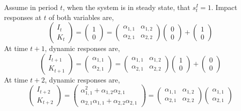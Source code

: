 \documentclass{article}
\begin{document}
Assume in period $t$, when the system is in steady state, that $s_t^I = 1$. Impact responses at $t$ of both variables are,
\begin{equation}\label{eq:I_responses_zero}
\begin{pmatrix}
I_t \\
K_t
\end{pmatrix} = \begin{pmatrix}
1 \\
0
\end{pmatrix} = \begin{pmatrix}
\alpha_{1,1} & \alpha_{1,2} \\
\alpha_{2,1} & \alpha_{2,2}
\end{pmatrix}\begin{pmatrix}
0 \\
0
\end{pmatrix} + \begin{pmatrix}
1 \\ 
0
\end{pmatrix}
\end{equation} 
At time $t + 1$, dynamic responses are,
\begin{equation}\label{eq:I_responses_one}
\begin{pmatrix}
I_{t+1} \\
K_{t+1}
\end{pmatrix} = \begin{pmatrix}
\alpha_{1,1} \\
\alpha_{2,1}
\end{pmatrix} = \begin{pmatrix}
\alpha_{1,1} & \alpha_{1,2} \\
\alpha_{2,1} & \alpha_{2,2}
\end{pmatrix}\begin{pmatrix}
1 \\
0
\end{pmatrix} + \begin{pmatrix}
0 \\ 
0
\end{pmatrix}
\end{equation} 
At time $t + 2$, dynamic responses are,
\begin{equation}\label{eq:I_responses_two}
\begin{pmatrix}
I_{t+2} \\
K_{t+2}
\end{pmatrix} = \begin{pmatrix}
\alpha_{1,1}^2 + \alpha_{1,2}\alpha_{2,1} \\
\alpha_{2,1}\alpha_{1,1} + \alpha_{2,2}\alpha_{2,1}
\end{pmatrix} = \begin{pmatrix}
\alpha_{1,1} & \alpha_{1,2} \\
\alpha_{2,1} & \alpha_{2,2}
\end{pmatrix}\begin{pmatrix}
\alpha_{1,1} \\
\alpha_{2,1}
\end{pmatrix} 
\end{equation} 
\end{document}
